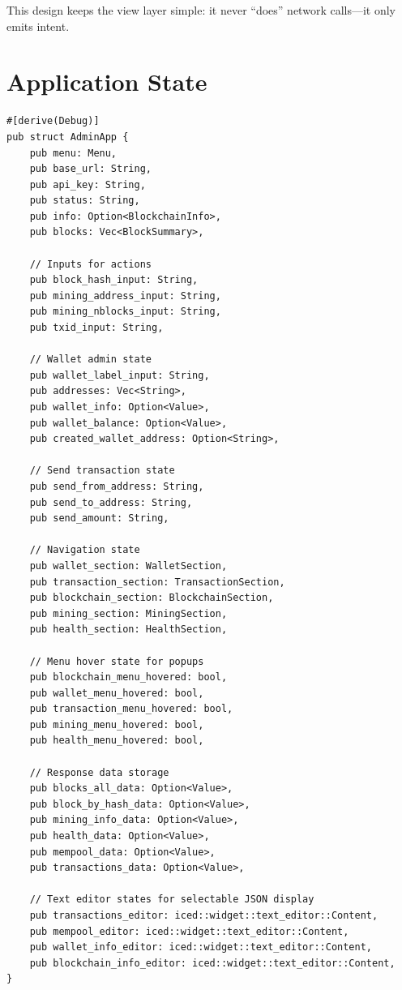 This design keeps the view layer simple: it never ``does'' network calls---it only emits intent.

\section{Application State}
\label{sec:ch16-app-state}

\begin{listing}[H]
\caption{Application state ()}
\label{lst:ch16-adminapp}
\begin{verbatim}
#[derive(Debug)]
pub struct AdminApp {
    pub menu: Menu,
    pub base_url: String,
    pub api_key: String,
    pub status: String,
    pub info: Option<BlockchainInfo>,
    pub blocks: Vec<BlockSummary>,

    // Inputs for actions
    pub block_hash_input: String,
    pub mining_address_input: String,
    pub mining_nblocks_input: String,
    pub txid_input: String,

    // Wallet admin state
    pub wallet_label_input: String,
    pub addresses: Vec<String>,
    pub wallet_info: Option<Value>,
    pub wallet_balance: Option<Value>,
    pub created_wallet_address: Option<String>,

    // Send transaction state
    pub send_from_address: String,
    pub send_to_address: String,
    pub send_amount: String,

    // Navigation state
    pub wallet_section: WalletSection,
    pub transaction_section: TransactionSection,
    pub blockchain_section: BlockchainSection,
    pub mining_section: MiningSection,
    pub health_section: HealthSection,

    // Menu hover state for popups
    pub blockchain_menu_hovered: bool,
    pub wallet_menu_hovered: bool,
    pub transaction_menu_hovered: bool,
    pub mining_menu_hovered: bool,
    pub health_menu_hovered: bool,

    // Response data storage
    pub blocks_all_data: Option<Value>,
    pub block_by_hash_data: Option<Value>,
    pub mining_info_data: Option<Value>,
    pub health_data: Option<Value>,
    pub mempool_data: Option<Value>,
    pub transactions_data: Option<Value>,

    // Text editor states for selectable JSON display
    pub transactions_editor: iced::widget::text_editor::Content,
    pub mempool_editor: iced::widget::text_editor::Content,
    pub wallet_info_editor: iced::widget::text_editor::Content,
    pub blockchain_info_editor: iced::widget::text_editor::Content,
}


\end{verbatim}
\end{listing}
